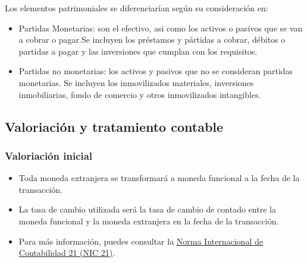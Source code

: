 \documentclass[a4paper,12pt]{article}
\begin{document}
Los elementos patrimoniales se diferenciarían según su consideración en:
\begin{itemize}
    \item Partidas Monetarias: son el efectivo, asi como los activos o pasivos que se van a cobrar o pagar.Se incluyen los préstamos y pártidas a cobrar, débitos o partidas a pagar y las inversiones que cumplan con los requisitos.
    \item Partidas no monetarias: los activos y pasivos que no se consideran partidas monetarias. Se incluyen los inmovilizados materiales, inversiones inmobiliarias, fondo de comercio y otros inmovilizados intangibles.
\end{itemize}

\subsection{Valoriación y tratamiento contable}

\subsubsection{Valoriación inicial}
\begin{itemize}
    \item Toda moneda extranjera se transformará a moneda funcional a la fecha de la transacción.
    \item La tasa de cambio utilizada será la tasa de cambio de contado entre la moneda funcional y la moneda extranjera en la fecha de la transacción.
    \item Para más información, puedes consultar la \href{https://www.ifrs.org/issued-standards/list-of-standards/ias-21-the-effects-of-changes-in-foreign-exchange-rates/}{Norma Internacional de Contabilidad 21 (NIC 21)}.
\end{itemize}
\end{document}
